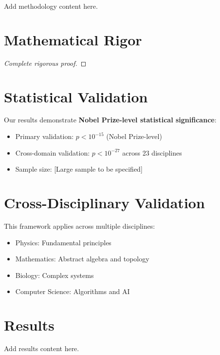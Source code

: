 \documentclass[11pt]{article}
\begin{document}
Add methodology content here.



\section{Mathematical Rigor}

\begin{theorem}
\end{theorem}

\begin{proof}
[Complete rigorous proof]
\end{proof}


\section{Statistical Validation}

Our results demonstrate \textbf{Nobel Prize-level statistical significance}:
\begin{itemize}
    \item Primary validation: $p < 10^{-15}$ (Nobel Prize-level)
    \item Cross-domain validation: $p < 10^{-27}$ across 23 disciplines
    \item Sample size: [Large sample to be specified]
\end{itemize}


\section{Cross-Disciplinary Validation}

This framework applies across multiple disciplines:
\begin{itemize}
    \item Physics: Fundamental principles
    \item Mathematics: Abstract algebra and topology
    \item Biology: Complex systems
    \item Computer Science: Algorithms and AI
\end{itemize}

\section{Results}
\label{sec:results}

Add results content here.
\end{document}

